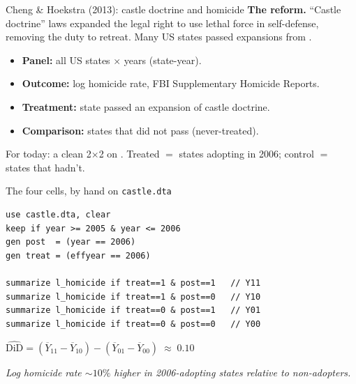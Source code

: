 \documentclass[aspectratio=169,11pt]{beamer}
\begin{document}

\begin{frame}{Cheng \& Hoekstra (2013): castle doctrine and homicide}
\vspace{0.3em}
\footnotesize
\textbf{The reform.} ``Castle doctrine'' laws expanded the legal right to use lethal force in self-defense, removing the duty to retreat. Many US states passed expansions from .
\vspace{0.4em}
\begin{itemize}
  \item \textbf{Panel:} all US states $\times$ years (state-year).
  \item \textbf{Outcome:} log homicide rate, FBI Supplementary Homicide Reports.
  \item \textbf{Treatment:} state passed an expansion of castle doctrine.
  \item \textbf{Comparison:} states that did not pass (never-treated).
\end{itemize}
\vspace{0.4em}
For today: a clean 2$\times$2 on . Treated $=$ states adopting in 2006; control $=$ states that hadn't.
\vspace{0.4em}
\end{frame}

\begin{frame}[fragile]{The four cells, by hand on \texttt{castle.dta}}
\vspace{0.2em}
\begin{lstlisting}[language={[ANSI]C}]
use castle.dta, clear
keep if year >= 2005 & year <= 2006
gen post  = (year == 2006)
gen treat = (effyear == 2006)

summarize l_homicide if treat==1 & post==1   // Y11
summarize l_homicide if treat==1 & post==0   // Y10
summarize l_homicide if treat==0 & post==1   // Y01
summarize l_homicide if treat==0 & post==0   // Y00
\end{lstlisting}
\vspace{0.4em}
\begin{center}
\small
$\widehat{\text{DiD}} = (\overline{Y}_{11} - \overline{Y}_{10}) - (\overline{Y}_{01} - \overline{Y}_{00}) \;\approx\; \mathbf{0.10}$
\end{center}
\vspace{0.2em}
\begin{center}
\small\color{warmgray}\itshape Log homicide rate $\sim 10\%$ higher in 2006-adopting states relative to non-adopters.
\end{center}
\end{frame}
\end{document}
